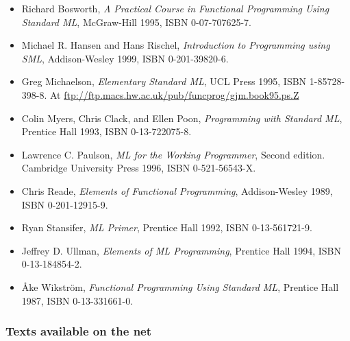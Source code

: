 \documentclass[fleqn,a4paper]{article}
\begin{document}
\begin{itemize}
\item Richard Bosworth, {\em A Practical Course in Functional
    Programming Using Standard ML}, McGraw-Hill 1995, ISBN
  0-07-707625-7.
\item Michael R. Hansen and Hans Rischel, \emph{Introduction to
    Programming using SML}, Addison-Wesley 1999, ISBN 0-201-39820-6.
\item Greg Michaelson, {\em Elementary Standard ML\/}, UCL Press 1995,
  ISBN 1-85728-398-8. At
\url{ftp://ftp.macs.hw.ac.uk/pub/funcprog/gjm.book95.ps.Z}
\item Colin Myers, Chris Clack, and Ellen Poon, {\em Programming with
    Standard ML\/}, Prentice Hall 1993, ISBN 0-13-722075-8.
\item Lawrence C. Paulson, {\em ML for the Working Programmer\/},
  Second edition.  Cambridge University Press 1996, ISBN
  0-521-56543-X.  
\item Chris Reade, {\em Elements of Functional Programming\/},
  Addison-Wesley 1989, ISBN 0-201-12915-9.
\item Ryan Stansifer, {\em ML Primer\/}, Prentice Hall 1992, ISBN
  0-13-561721-9.
\item Jeffrey D. Ullman, {\em Elements of ML Programming\/}, Prentice
  Hall 1994, ISBN 0-13-184854-2.
\item {\AA}ke Wikstr{\"o}m, {\em Functional Programming Using Standard
    ML\/}, Prentice Hall 1987, ISBN 0-13-331661-0.
\end{itemize}

\subsubsection*{Texts available on the net}
\end{document}
